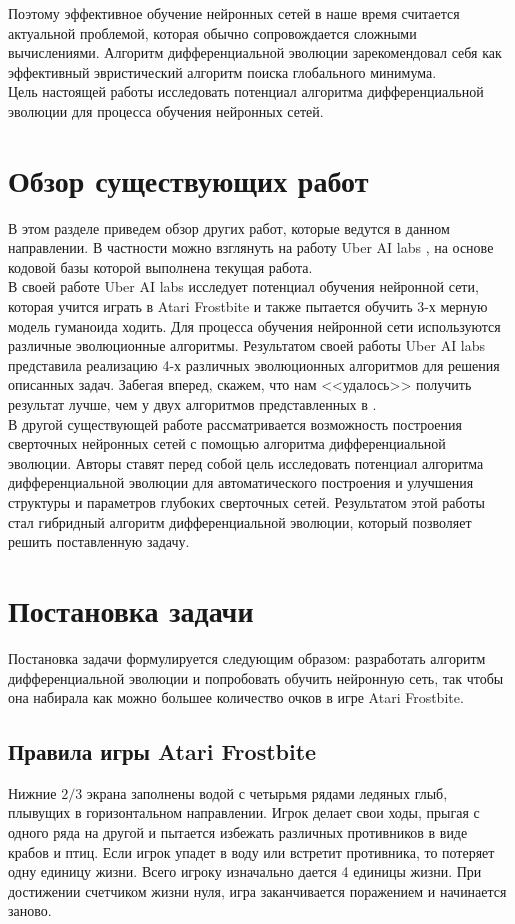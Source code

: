 \documentclass[12pt]{article}
\begin{document}
    Поэтому эффективное обучение нейронных сетей в наше время считается актуальной проблемой, которая обычно сопровождается сложными вычислениями. Алгоритм дифференциальной эволюции зарекомендовал себя как эффективный эвристический алгоритм поиска глобального минимума. \\
    
    Цель настоящей работы исследовать потенциал алгоритма дифференциальной эволюции для процесса обучения нейронных сетей. 

\section{Обзор существующих работ}
    В этом разделе приведем обзор других работ, которые ведутся в данном направлении. В частности можно взглянуть на работу Uber AI labs \cite{uber}, на основе кодовой базы которой выполнена текущая работа. \\

    В своей работе Uber AI labs исследует потенциал обучения нейронной сети, которая учится играть в Atari Frostbite и также пытается обучить 3-х мерную модель гуманоида ходить. Для процесса обучения нейронной сети используются различные эволюционные алгоритмы. Результатом своей работы Uber AI labs представила реализацию 4-х различных эволюционных алгоритмов для решения описанных задач. Забегая вперед, скажем, что нам <<удалось>> получить результат лучше, чем у двух алгоритмов представленных в \cite{uber}. \\

    В другой существующей работе \cite{de-for-cnn-design} рассматривается возможность построения сверточных нейронных сетей с помощью алгоритма дифференциальной эволюции. Авторы ставят перед собой цель исследовать потенциал алгоритма дифференциальной эволюции для автоматического построения и улучшения структуры и параметров глубоких сверточных сетей. Результатом этой работы стал гибридный алгоритм дифференциальной эволюции, который позволяет решить поставленную задачу.

\section{Постановка задачи}
    Постановка задачи формулируется следующим образом: разработать алгоритм дифференциальной эволюции и попробовать обучить нейронную сеть, так чтобы она набирала как можно большее количество очков в игре Atari Frostbite.

    \subsection{Правила игры Atari Frostbite}
    Нижние $2/3$ экрана заполнены водой с четырьмя рядами ледяных глыб, плывущих в горизонтальном направлении. Игрок делает свои ходы, прыгая с одного ряда на другой и пытается избежать различных противников в виде крабов и птиц. Если игрок упадет в воду или встретит противника, то потеряет одну единицу жизни. Всего игроку изначально дается 4 единицы жизни. При достижении счетчиком жизни нуля, игра заканчивается поражением и начинается заново.  \\
\end{document}
